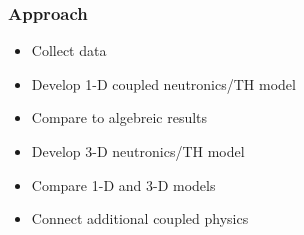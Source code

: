 \begin{frame}[fragile]
  \frametitle{Approach}
  \begin{itemize}
    \item Collect data
    \item Develop 1-D coupled neutronics/TH model
    \item Compare to algebreic results
    \item Develop 3-D neutronics/TH model
    \item Compare 1-D and 3-D models
    \item Connect additional coupled physics
  \end{itemize}

\end{frame}
